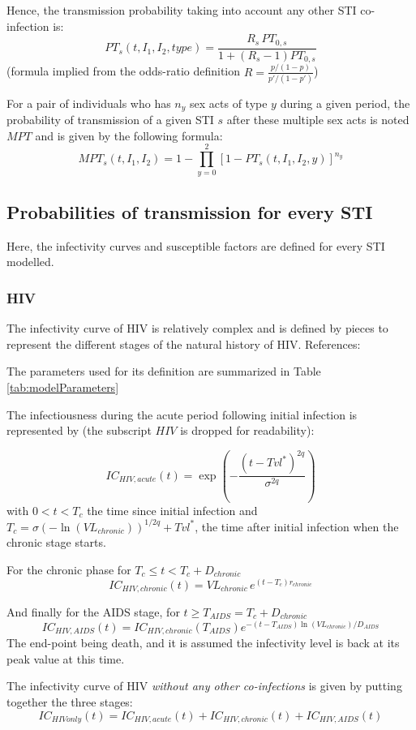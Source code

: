 \documentclass[11pt, onecolumn]{article}
\begin{document}
Hence, the transmission probability taking into account any other STI co-infection is:
$$PT_s(t,I_1,I_2,type) =\frac{R_s\,  PT_{0,s} }{1+ (R_s-1)PT_{0,s} }$$
(formula implied from the odds-ratio definition $R=\frac{p/(1-p)}{p'/(1-p')}$)

For a pair of individuals who has $n_{y}$ sex acts of type $y$ during a given period, the probability of transmission of a given STI $s$ after these multiple sex acts is noted $MPT$ and is given by the following formula:
$$ MPT_s(t,I_1,I_2) = 1- \prod_{y=0}^{2}[1-PT_s(t,I_1,I_2,y)]^{n_y} $$


\subsection{Probabilities of transmission for every STI}
\label{sec:probaTransmission}
Here, the infectivity curves and susceptible factors are defined for every STI modelled.

\subsubsection{HIV}
The infectivity curve of HIV is relatively complex and is defined by pieces to represent the different stages of the natural history of HIV. References: \cite{Pilcher:2007wr}

The parameters used for its definition are summarized in Table \ref{tab:modelParameters}

The infectiousness during the acute period following initial infection is represented by (the subscript $HIV$ is dropped for readability):

$$IC_{HIV,acute}(t) = \exp\left( -\frac{(t-Tvl^*)^{2q}}{\sigma^{2q}} \right)$$
with $ 0<t<T_c$ the time since initial infection and $T_c = \sigma (-\ln(VL_{chronic}))^{1/2q} + Tvl^*$, the time after initial infection when the chronic stage starts.

For the chronic phase for $T_c\leq t < T_c+D_{chronic}$
$$ IC_{HIV,chronic}(t) = VL_{chronic} \, e^{(t-T_c)r_{chronic}} $$

And finally for the AIDS stage, for $ t \geq T_{AIDS}= T_c+D_{chronic}$
$$IC_{HIV,AIDS}(t) = IC_{HIV,chronic}(T_{AIDS}) e^{-(t-T_{AIDS}) \ln(VL_{chronic})/D_{AIDS}}$$
The end-point being death, and it is assumed the infectivity level is back at its peak value at this time.

The infectivity curve of HIV \emph{without any other co-infections} is given by putting together the three stages:
$$ IC_{HIVonly}(t) = IC_{HIV,acute}(t)+IC_{HIV,chronic}(t)+IC_{HIV,AIDS}(t)$$
\end{document}
